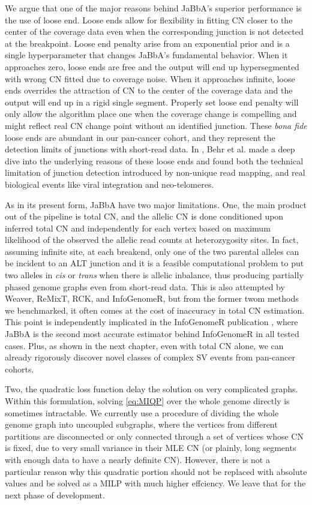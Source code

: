 \documentclass[phd,tocprelim]{cornell}
\begin{document}
We argue that one of the major reasons behind JaBbA's superior performance is the use of loose end. Loose ends allow for flexibility in fitting CN closer to the center of the coverage data even when the corresponding junction is not detected at the breakpoint. Loose end penalty \textlambda arise from an exponential prior and is a single hyperparameter that changes JaBbA's fundamental behavior. When it approaches zero, loose ends are free and the output will end up hypersegmented with wrong CN fitted due to coverage noise. When it approaches infinite, loose ends overrides the attraction of CN to the center of the coverage data and the output will end up in a rigid single segment. Properly set loose end penalty will only allow the algorithm place one when the coverage change is compelling and might reflect real CN change point without an identified junction. These \textit{bona fide} loose ends are abundant in our pan-cancer cohort, and they represent the detection limits of junctions with short-read data. In \cite{Behr2021-gf}, Behr et al. made a deep dive into the underlying reasons of these loose ends and found both the technical limitation of junction detection introduced by non-unique read mapping, and real biological events like viral integration and neo-telomeres.

As in its present form, JaBbA have two major limitations. One, the main product out of the pipeline is total CN, and the allelic CN is done conditioned upon inferred total CN and independently for each vertex based on maximum likelihood of the observed the allelic read counts at heterozygosity sites. In fact, assuming infinite site, at each breakend, only one of the two parental alleles can be incident to an ALT junction and it is a feasible computational problem to put two alleles in \textit{cis} or \textit{trans} when there is allelic inbalance, thus producing partially phased genome graphs even from short-read data. This is also attempted by Weaver, ReMixT, RCK, and InfoGenomeR, but from the former twom methods we benchmarked, it often comes at the cost of inaccuracy in total CN estimation. This point is independently implicated in the InfoGenomeR publication \cite{Lee2021-rl}, where JaBbA is the second most accurate estimator behind InfoGenomeR in all tested cases. Plus, as shown in the next chapter, even with total CN alone, we can already rigorously discover novel classes of complex SV events from pan-cancer cohorts.

Two, the quadratic loss function delay the solution on very complicated graphs. Within this formulation, solving \ref{eq:MIQP} over the whole genome directly is sometimes intractable. We currently use a procedure of dividing the whole genome graph into uncoupled subgraphs, where the vertices from different partitions are disconnected or only connected through a set of vertices whose CN is fixed, due to very small variance in their MLE CN (or plainly, long segments with enough data to have a nearly definite CN). However, there is not a particular reason why this quadratic portion should not be replaced with absolute values and be solved as a MILP with much higher effciency. We leave that for the next phase of development.
\end{document}
